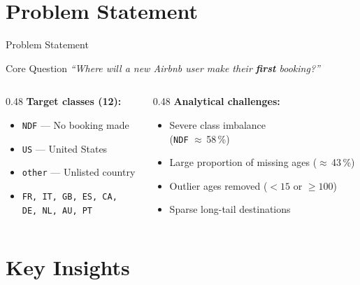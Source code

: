 \documentclass[aspectratio=169]{beamer}
\begin{document}
\section{Problem Statement}
\begin{frame}{Problem Statement}
  \begin{block}{Core Question}
    \centering
    \large\textit{``Where will a new Airbnb user make their \textbf{first} booking?''}
  \end{block}
  \vspace{10pt}
  \begin{columns}[T]
    \begin{column}{0.48\textwidth}
      \textbf{Target classes (12):}
      \begin{itemize}
        \item \alert{\texttt{NDF}} --- No booking made
        \item \texttt{US} --- United States
        \item \texttt{other} --- Unlisted country
        \item \texttt{FR, IT, GB, ES, CA,}\\
              \texttt{DE, NL, AU, PT}
      \end{itemize}
    \end{column}
    \begin{column}{0.48\textwidth}
      \textbf{Analytical challenges:}
      \begin{itemize}
        \item Severe class imbalance\\(\texttt{NDF} $\approx$\,58\,\%)
        \item Large proportion of missing ages ($\approx$\,43\,\%)
        \item Outlier ages removed ($<15$ or $\geq100$)
        \item Sparse long-tail destinations
      \end{itemize}
    \end{column}
  \end{columns}
\end{frame}

\section{Key Insights}
\end{document}
